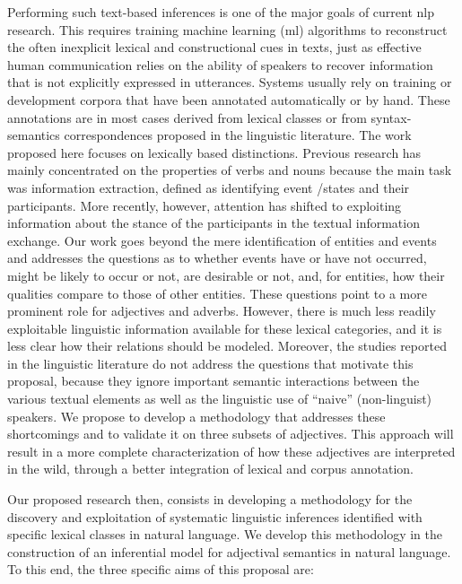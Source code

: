\documentclass[10pt]{article}
\begin{document}
Performing such text-based inferences is one of the major goals of current {\sc nlp} research. 
This requires training machine learning ({\sc ml}) algorithms to  reconstruct the often inexplicit lexical and constructional cues in texts, just as effective human communication relies on the ability of speakers to recover information that is not explicitly expressed in utterances. Systems usually rely on training or development corpora that have been annotated automatically or by hand.  These annotations are in most cases derived from lexical classes or from syntax-semantics correspondences proposed in the linguistic literature. The work proposed here focuses on lexically based distinctions. Previous research has mainly concentrated on the properties of verbs and nouns because the main task was information extraction, defined as identifying event /states and their participants. More recently, however, attention has shifted to exploiting information about the stance of the participants in the textual information exchange. Our work goes beyond the mere identification of entities and events and addresses the questions as to whether events have or have not occurred, might be likely to occur or not, are desirable or not, and, for entities, how their qualities compare to those of other entities. These questions point to a more prominent role for adjectives and adverbs. However, there is much less readily exploitable linguistic information available for these lexical categories, and it is less clear how their relations should be modeled. 
Moreover, the studies reported in the linguistic literature do not address the questions that motivate this proposal, because they ignore important semantic interactions 
between the various textual elements as well as the linguistic use of ``naive'' (non-linguist) speakers. 
We propose to develop a methodology that addresses these shortcomings and to validate it on three subsets of adjectives.
This approach will result in a more complete characterization of how  these adjectives are interpreted in the wild, through a better integration of lexical and corpus annotation. 
 
Our proposed research then, consists  in developing a methodology for the discovery and exploitation of systematic linguistic inferences identified with specific lexical classes in natural language. We develop this methodology in the construction of an inferential model for adjectival semantics in natural language. To this end, the three specific aims of this proposal are:
\end{document}
